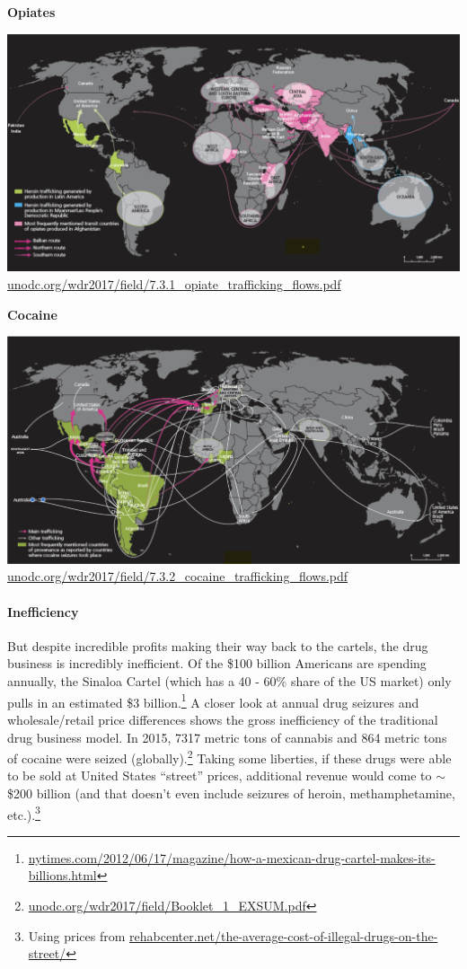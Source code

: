 \documentclass[12pt]{article}
\begin{document}
\begin{center}

\large\textbf{Opiates}
\medskip

\includegraphics[width=17cm]{opiate_flows.png}
\normalsize\url{unodc.org/wdr2017/field/7.3.1_opiate_trafficking_flows.pdf}
\bigskip
\bigskip

\large\textbf{Cocaine}
\medskip

\includegraphics[width=17cm]{cocaine_flows.png}
\normalsize\url{unodc.org/wdr2017/field/7.3.2_cocaine_trafficking_flows.pdf}

\clearpage
\end{center}



\paragraph{Inefficiency} But despite incredible profits making their way back to the cartels, the drug business is incredibly inefficient. Of the \$100 billion Americans are spending annually, the Sinaloa Cartel (which has a 40 - 60\% share of the US market) only pulls in an estimated \$3 billion.\footnote{\url{nytimes.com/2012/06/17/magazine/how-a-mexican-drug-cartel-makes-its-billions.html}}
A closer look at annual drug seizures and wholesale/retail price differences shows the gross inefficiency of the traditional drug business model. In 2015, 7317 metric tons of cannabis and 864 metric tons of cocaine were seized (globally).\footnote{\url{unodc.org/wdr2017/field/Booklet_1_EXSUM.pdf}} Taking some liberties, if these drugs were able to be sold at United States ``street'' prices, additional revenue would come to $\sim$\$200 billion (and that doesn't even include seizures of heroin, methamphetamine, etc.).\footnote{Using prices from \url{rehabcenter.net/the-average-cost-of-illegal-drugs-on-the-street/}}
\\
\end{document}
